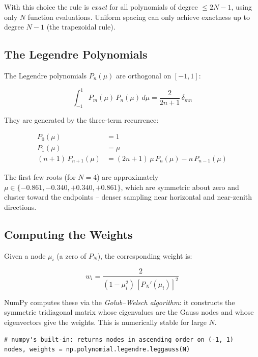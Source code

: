 \documentclass[12pt]{article}
\begin{document}
With this choice the rule is \emph{exact} for all polynomials of degree
$\leq 2N - 1$, using only $N$ function evaluations. Uniform spacing can only
achieve exactness up to degree $N - 1$ (the trapezoidal rule).

\subsection{The Legendre Polynomials}

The Legendre polynomials $P_n(\mu)$ are orthogonal on $[-1, 1]$:

\begin{equation}
  \int_{-1}^{1} P_m(\mu)\,P_n(\mu)\,d\mu
  = \frac{2}{2n+1}\,\delta_{mn}
\end{equation}

They are generated by the three-term recurrence:

\begin{align}
  P_0(\mu) &= 1 \\
  P_1(\mu) &= \mu \\
  (n+1)\,P_{n+1}(\mu) &= (2n+1)\,\mu\,P_n(\mu) - n\,P_{n-1}(\mu)
\end{align}

The first few roots (for $N = 4$) are approximately
$\mu \in \{-0.861, -0.340, +0.340, +0.861\}$,
which are symmetric about zero and cluster toward the endpoints -- denser
sampling near horizontal and near-zenith directions.

\subsection{Computing the Weights}

Given a node $\mu_i$ (a zero of $P_N$), the corresponding weight is:

\begin{equation}
  w_i = \frac{2}{(1 - \mu_i^2)\,[P_N'(\mu_i)]^2}
\end{equation}

NumPy computes these via the \emph{Golub--Welsch algorithm}: it constructs the
symmetric tridiagonal matrix whose eigenvalues are the Gauss nodes and whose
eigenvectors give the weights. This is numerically stable for large $N$.

\begin{lstlisting}
# numpy's built-in: returns nodes in ascending order on (-1, 1)
nodes, weights = np.polynomial.legendre.leggauss(N)
\end{lstlisting}
\end{document}
